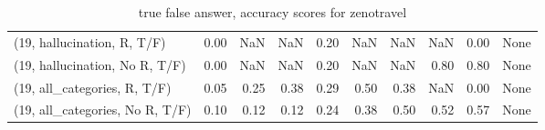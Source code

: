 \begin{table*}[h!]
\begin{adjustbox}{width=2\columnwidth,center}
\begin{tabular}{lrrr|rrr|rrr}
(19, hallucination, R, T/F)           &                      0.00 &                   NaN &                       NaN &                          0.20 &                       NaN &                           NaN &                                    NaN &                               0.00 &                                  None \\
(19, hallucination, No R, T/F)        &                      0.00 &                   NaN &                       NaN &                          0.20 &                       NaN &                           NaN &                                   0.80 &                               0.80 &                                  None \\
(19, all\_categories, R, T/F)          &                      0.05 &                  0.25 &                      0.38 &                          0.29 &                      0.50 &                          0.38 &                                    NaN &                               0.00 &                                  None \\
(19, all\_categories, No R, T/F)       &                      0.10 &                  0.12 &                      0.12 &                          0.24 &                      0.38 &                          0.50 &                                   0.52 &                               0.57 &                                  None \\


\bottomrule
\end{tabular}
\end{adjustbox}
\caption{true false answer, accuracy scores for zenotravel}
\end{table*}